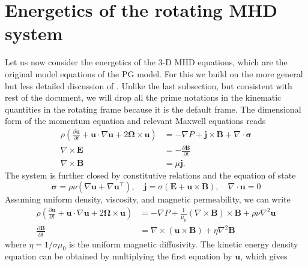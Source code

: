 \section{Energetics of the rotating MHD system}

Let us now consider the energetics of the 3-D MHD equations, which are the original model equations of the PG model. For this we build on the more general but less detailed discussion of \citet{braginsky_equations_1995}. Unlike the last subsection, but consistent with rest of the document, we will drop all the prime notations in the kinematic quantities in the rotating frame because it is the default frame. The dimensional form of the momentum equation and relevant Maxwell equations reads
%
\[
\begin{aligned}
    \rho \left(\frac{\partial \mathbf{u}}{\partial t} + \mathbf{u}\cdot \nabla \mathbf{u} + 2\boldsymbol{\Omega}\times \mathbf{u}\right) &=  - \nabla P + \mathbf{j}\times \mathbf{B} + \nabla\cdot \boldsymbol{\sigma} \\ 
    \nabla\times \mathbf{E} &= - \frac{\partial \mathbf{B}}{\partial t} \\ 
    \nabla\times \mathbf{B} &= \mu \mathbf{j}.
\end{aligned}
\]
%
The system is further closed by constitutive relations and the equation of state
\[
    \boldsymbol{\sigma} = \rho \nu \left(\nabla\mathbf{u} + \nabla \mathbf{u}^\intercal\right),\quad 
    \mathbf{j} = \sigma (\mathbf{E} + \mathbf{u}\times \mathbf{B}),\quad 
    \nabla\cdot \mathbf{u} = 0
\]
Assuming uniform density, viscosity, and magnetic permeability, we can write
%
\begin{equation}
\begin{aligned}
    \rho \left(\frac{\partial \mathbf{u}}{\partial t} + \mathbf{u}\cdot \nabla \mathbf{u} + 2\boldsymbol{\Omega}\times \mathbf{u}\right) &=  - \nabla P + \frac{1}{\mu_0} (\nabla\times \mathbf{B})\times \mathbf{B} + \rho \nu \nabla^2 \mathbf{u} \\ 
    \frac{\partial \mathbf{B}}{\partial t} &= \nabla\times (\mathbf{u}\times \mathbf{B}) + \eta \nabla^2 \mathbf{B}
\end{aligned}
\end{equation}
%
where $\eta = 1/\sigma\mu_0$ is the uniform magnetic diffusivity. The kinetic energy density equation can be obtained by multiplying the first equation by $\mathbf{u}$, which gives
%
